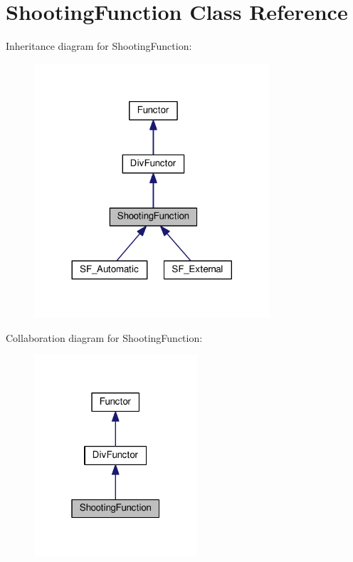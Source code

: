 \hypertarget{classShootingFunction}{}\section{Shooting\+Function Class Reference}
\label{classShootingFunction}


Inheritance diagram for Shooting\+Function\+:\nopagebreak
\begin{figure}[H]
\begin{center}
\leavevmode
\includegraphics[width=248pt]{classShootingFunction__inherit__graph}
\end{center}
\end{figure}


Collaboration diagram for Shooting\+Function\+:\nopagebreak
\begin{figure}[H]
\begin{center}
\leavevmode
\includegraphics[width=172pt]{classShootingFunction__coll__graph}
\end{center}
\end{figure}

